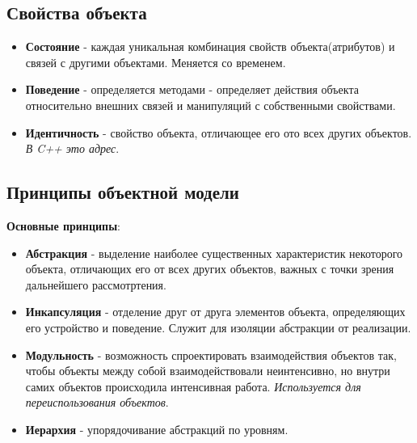 \subsection{Свойства объекта}
    \begin{itemize}
        
        \item \begin{definition}\textbf{Состояние} - каждая уникальная комбинация свойств объекта(атрибутов) и связей с другими объектами. Меняется со временем.
        \end{definition}
        
        \item \begin{definition}\textbf{Поведение} - определяется методами - определяет действия объекта относительно внешних связей и манипуляций с собственными свойствами.
        \end{definition}
        
        \item \begin{definition}\textbf{Идентичность} - свойство объекта, отличающее его ото всех других объектов. \textit{В C++ это адрес}.
        \end{definition}
    \end{itemize}
    
\subsection{Принципы объектной модели}
\textbf{Основные принципы}:
\begin{itemize}
    \item \begin{definition}\textbf{Абстракция} - выделение наиболее существенных характеристик некоторого объекта, отличающих его от всех других объектов, важных с точки зрения дальнейшего рассмотртения.\end{definition}
    \item \begin{definition}\textbf{Инкапсуляция} - отделение друг от друга элементов объекта, определяющих его устройство и поведение. Служит для изоляции абстракции от реализации.\end{definition} 
    \item \begin{definition}\textbf{Модульность} - возможность спроектировать взаимодействия объектов так, чтобы объекты между собой взаимодействовали неинтенсивно, но внутри самих объектов происходила интенсивная работа. \textit{Используется для переиспользования объектов}.\end{definition}
    \item \begin{definition}\textbf{Иерархия} - упорядочивание абстракций по уровням.\end{definition}
\end{itemize}

